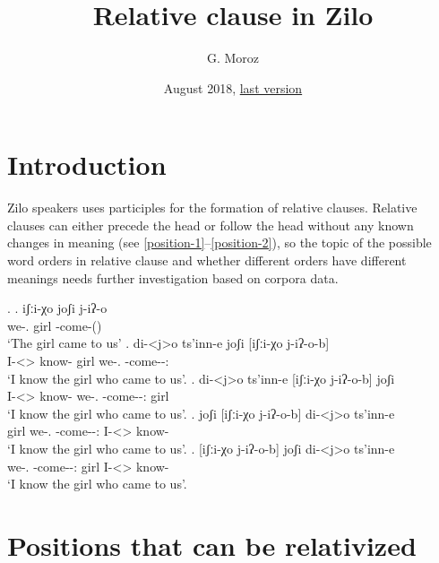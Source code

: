 
\title{\Large Relative clause in Zilo}
\author{G. Moroz}
\date{August 2018, \href{https://github.com/agricolamz/2018_Andi_relative_clause/raw/master/main.pdf}{last version}}
 
\maketitle

\section{Introduction}
Zilo speakers uses participles for the formation of relative clauses. Relative clauses can either precede the head or follow the head without any known changes in meaning (see \ref{position-1}--\ref{position-2}), so the topic of the possible word orders in relative clause and whether different orders have different meanings needs further investigation based on corpora data.

\ex. 
	\ag. iʃːi-χo joʃi j-iʔ-o\\
		 {we-\Add.\Lat} {girl} {\F-come-\Pst(\Aor)}\\
		 \glt    `The girl came to us'
	\bg. di-<j>o ts'inn-e joʃi [iʃːi-χo j-iʔ-o-b]\\
		 {I-<\F>\Aff} {know-\Hab} {girl} {we-\Add.\Lat} {\F-come-\Pst-\Ptcp:\Pst}\\
		 \glt    `I know the girl who came to us'. \label{position-1}
	\bg. di-<j>o ts'inn-e [iʃːi-χo j-iʔ-o-b] joʃi \\
		 {I-<\F>\Aff} {know-\Hab} {we-\Add.\Lat} {\F-come-\Pst-\Ptcp:\Pst} {girl}\\
		 \glt    `I know the girl who came to us'.
	\bg. joʃi  [iʃːi-χo j-iʔ-o-b] di-<j>o ts'inn-e \\
		  {girl}  {we-\Add.\Lat} {\F-come-\Pst-\Ptcp:\Pst} {I-<\F>\Aff} {know-\Hab}\\
		 \glt    `I know the girl who came to us'.
	\bg. [iʃːi-χo j-iʔ-o-b] joʃi di-<j>o ts'inn-e \\
		  {we-\Add.\Lat} {\F-come-\Pst-\Ptcp:\Pst} {girl} {I-<\F>\Aff} {know-\Hab}\\
		 \glt    `I know the girl who came to us'. \label{position-2}

\section{Positions that can be relativized}

